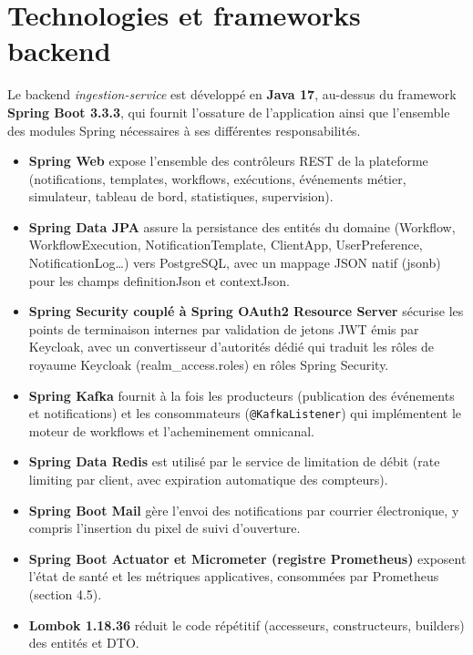 \documentclass[12pt,a4paper]{report}
\begin{document}
\section{Technologies et frameworks backend}

Le backend \textit{ingestion-service} est développé en \textbf{Java 17}, au-dessus du framework \textbf{Spring Boot 3.3.3}, qui fournit l'ossature de l'application ainsi que l'ensemble des modules Spring nécessaires à ses différentes responsabilités.

\begin{itemize}
  \item \textbf{Spring Web} expose l'ensemble des contrôleurs REST de la plateforme (notifications, templates, workflows, exécutions, événements métier, simulateur, tableau de bord, statistiques, supervision).
  \item \textbf{Spring Data JPA} assure la persistance des entités du domaine (Workflow, WorkflowExecution, NotificationTemplate, ClientApp, UserPreference, NotificationLog…) vers PostgreSQL, avec un mappage JSON natif (jsonb) pour les champs definitionJson et contextJson.
  \item \textbf{Spring Security couplé à Spring OAuth2 Resource Server} sécurise les points de terminaison internes par validation de jetons JWT émis par Keycloak, avec un convertisseur d'autorités dédié qui traduit les rôles de royaume Keycloak (realm\_access.roles) en rôles Spring Security.
  \item \textbf{Spring Kafka} fournit à la fois les producteurs (publication des événements et notifications) et les consommateurs (\texttt{@KafkaListener}) qui implémentent le moteur de workflows et l'acheminement omnicanal.
  \item \textbf{Spring Data Redis} est utilisé par le service de limitation de débit (rate limiting par client, avec expiration automatique des compteurs).
  \item \textbf{Spring Boot Mail} gère l'envoi des notifications par courrier électronique, y compris l'insertion du pixel de suivi d'ouverture.
  \item \textbf{Spring Boot Actuator et Micrometer (registre Prometheus)} exposent l'état de santé et les métriques applicatives, consommées par Prometheus (section 4.5).
  \item \textbf{Lombok 1.18.36} réduit le code répétitif (accesseurs, constructeurs, builders) des entités et DTO.
\end{itemize}
\end{document}
